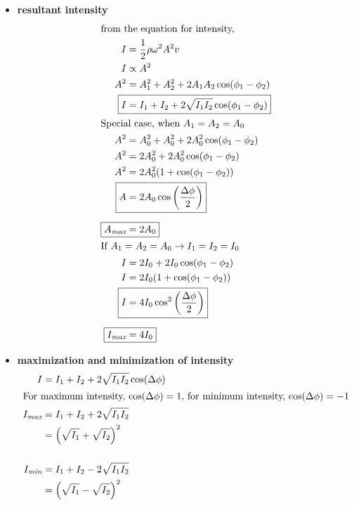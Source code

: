 \documentclass[11pt]{article}
\begin{document}
\begin{itemize}
\begin{itemize}
\begin{center}
        \end{center}
        \item \textbf{resultant intensity}
        \begin{align*}
            \intertext{from the equation for intensity,}
            I &= \frac{1}{2} \rho \omega^2 A^2 v\\
            I &\propto A^2\\
            A^2 &= A_1^2 + A_2^2 + 2A_1A_2\cos(\phi_1 - \phi_2)\\
            \Aboxed{I &= I_1 + I_2 + 2\sqrt{I_1I_2}\cos(\phi_1 - \phi_2)}\\
            \intertext{Special case, when $A_1=A_2=A_0$}
            A^2 &= A_0^2 + A_0^2 + 2A_0^2\cos(\phi_1 - \phi_2)\\
            A^2 &= 2A_0^2 + 2A_0^2\cos(\phi_1 - \phi_2)\\
            A^2 &= 2A_0^2(1 + \cos(\phi_1 - \phi_2))\\
            \Aboxed{A &= 2A_0\cos\left(\frac{\Delta \phi}{2}\right)}\\[2mm]
            \Aboxed{A_{\textit{max}} &= 2A_0}\\
            \intertext{If $A_1=A_2=A_0 \rightarrow I_1=I_2=I_0$ }
            I &= 2I_0 + 2I_0\cos(\phi_1 - \phi_2)\\
            I &= 2I_0(1 + \cos(\phi_1 - \phi_2))\\
            \Aboxed{I &= 4I_0\cos^2\left(\frac{\Delta \phi}{2}\right)}\\[2mm]
            \Aboxed{I_{\textit{max}} &= 4I_0}\\
        \end{align*}
        \pagebreak
        \item \textbf{maximization and minimization of intensity}
        \begin{align*}
            I &= I_1 + I_2 + 2\sqrt{I_1I_2}\cos(\Delta \phi)\\
            \intertext{For maximum intensity, $\cos(\Delta \phi) = 1$, for minimum intensity, $\cos(\Delta \phi) = -1$}
            I_{\textit{max}} &= I_1 + I_2 + 2\sqrt{I_1I_2}\\
                            &= \left(\sqrt{I_1} + \sqrt{I_2}\right)^2\\[5mm]
            I_{\textit{min}} &= I_1 + I_2 - 2\sqrt{I_1I_2}\\
                            &= \left(\sqrt{I_1} - \sqrt{I_2}\right)^2\\
        \end{align*}
    \end{itemize}

\end{itemize}
\end{document}
